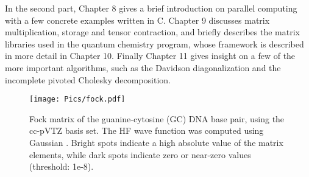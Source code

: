 In the second part, Chapter 8 gives a brief introduction on parallel computing with a few concrete examples written in C. Chapter 9 discusses matrix multiplication, storage and tensor contraction, and briefly describes the matrix libraries used in the \mchem{} quantum chemistry program, whose framework is described in more detail in Chapter 10. Finally Chapter 11 gives insight on a few of the more important algorithms, such as the Davidson diagonalization and the incomplete pivoted Cholesky decomposition.    

\begin{figure}
\centering
\texttt{[image: Pics/fock.pdf]}
\caption[Fock matrix of the GC DNA base pair]{Fock matrix of the guanine-cytosine (GC) DNA base pair, using the cc-pVTZ basis set. The HF wave function was computed using Gaussian \cite{Fri2016}. Bright spots indicate a high absolute value of the matrix elements, while dark spots indicate zero or near-zero values (threshold: 1e-8).}
\label{SparseExample}
\end{figure}